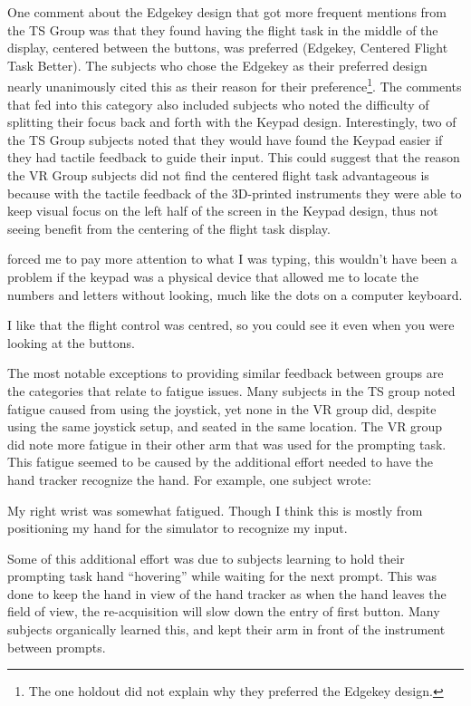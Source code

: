 One comment about the Edgekey design that got more frequent mentions from the TS Group was that they found having the flight task in the middle of the display, centered between the buttons, was preferred (Edgekey, Centered Flight Task Better).
The subjects who chose the Edgekey as their preferred design nearly unanimously cited this as their reason for their preference\footnote{The one holdout did not explain why they preferred the Edgekey design.}.
The comments that fed into this category also included subjects who noted the difficulty of splitting their focus back and forth with the Keypad design.
Interestingly, two of the TS Group subjects noted that they would have found the Keypad easier if they had tactile feedback to guide their input.
This could suggest that the reason the VR Group subjects did not find the centered flight task advantageous is because with the tactile feedback of the 3D-printed instruments they were able to keep visual focus on the left half of the screen in the Keypad design, thus not seeing benefit from the centering of the flight task display.
\begin{displayquote}[TS Subject]
     forced me to pay more attention to what I was typing, this wouldn't have been a problem if the keypad was a physical device that allowed me to locate the numbers and letters without looking, much like the dots on a computer keyboard.
\end{displayquote}
\begin{displayquote}[VR Subject]
    I like that the flight control was centred, so you could see it even when you were looking at the buttons.
\end{displayquote}

The most notable exceptions to providing similar feedback between groups are the categories that relate to fatigue issues.
Many subjects in the TS group noted fatigue caused from using the joystick, yet none in the VR group did, despite using the same joystick setup, and seated in the same location.
The VR group did note more fatigue in their other arm that was used for the prompting task.
This fatigue seemed to be caused by the additional effort needed to have the hand tracker recognize the hand.
For example, one subject wrote:
\begin{displayquote}[VR Subject]
    My right wrist was somewhat fatigued.  Though I think this is mostly from positioning my hand for the simulator to recognize my input.
\end{displayquote}
Some of this additional effort was due to subjects learning to hold their prompting task hand ``hovering'' while waiting for the next prompt.
This was done to keep the hand in view of the hand tracker as when the hand leaves the field of view, the re-acquisition will slow down the entry of first button.
Many subjects organically learned this, and kept their arm in front of the instrument between prompts.

